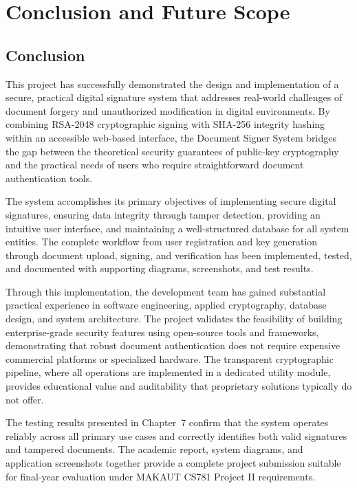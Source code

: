 \chapter{Conclusion and Future Scope}

\section{Conclusion}

This project has successfully demonstrated the design and implementation of a secure, practical digital signature system that addresses real-world challenges of document forgery and unauthorized modification in digital environments. By combining RSA-2048 cryptographic signing with SHA-256 integrity hashing within an accessible web-based interface, the Document Signer System bridges the gap between the theoretical security guarantees of public-key cryptography and the practical needs of users who require straightforward document authentication tools.

The system accomplishes its primary objectives of implementing secure digital signatures, ensuring data integrity through tamper detection, providing an intuitive user interface, and maintaining a well-structured database for all system entities. The complete workflow from user registration and key generation through document upload, signing, and verification has been implemented, tested, and documented with supporting diagrams, screenshots, and test results.

Through this implementation, the development team has gained substantial practical experience in software engineering, applied cryptography, database design, and system architecture. The project validates the feasibility of building enterprise-grade security features using open-source tools and frameworks, demonstrating that robust document authentication does not require expensive commercial platforms or specialized hardware. The transparent cryptographic pipeline, where all operations are implemented in a dedicated utility module, provides educational value and auditability that proprietary solutions typically do not offer.

The testing results presented in Chapter~7 confirm that the system operates reliably across all primary use cases and correctly identifies both valid signatures and tampered documents. The academic report, system diagrams, and application screenshots together provide a complete project submission suitable for final-year evaluation under MAKAUT CS781 Project II requirements.

